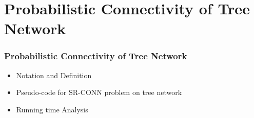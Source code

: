 \documentclass{beamer}
\newcommand{\SRCONN}   { {\mathrm {SR\mbox{-}CONN}} }
\begin{document}
\section{Probabilistic Connectivity of Tree Network}
\begin{frame}
\frametitle{Probabilistic Connectivity of Tree Network}
\begin{itemize}
\item Notation and Definition
\item Pseudo-code for $\SRCONN$ problem on tree network
\item Running time Analysis
\end{itemize}
\end{frame}
\end{document}
